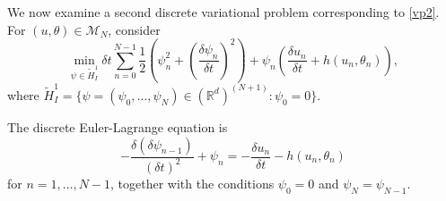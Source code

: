 \documentclass[12pt]{amsart}
\newcommand{\Rr}{{\mathbb{R}}}
\newcommand{\1}{{\chi}}
\newcommand{\lb}{\left(}
\newcommand{\rb}{\right)}
\theoremstyle{definition}
\begin{document}
         We now examine a second discrete variational problem corresponding to \eqref{vp2}. 
         For $(u,\theta)\in \mathcal{M}_N$, consider
     \begin{equation*}
                \min_{\psi\in \tilde H^1_I} \delta t \sum_{n=0}^{N-1} \frac{1}{2} \lb\psi_n^2 + \lb\frac{\delta\psi_n}{\delta t}\rb^2\rb 
            + \psi_n \lb \frac{\delta u_n}{\delta t} + h(u_n, \theta_n) \rb,   
      \end{equation*}
      where $\tilde H^1_I =\{\psi=(\psi_0, \hdots, \psi_N)\in (\Rr^d)^{(N+1)}:\psi_0=0\}$.
          
      The discrete Euler-Lagrange equation is 
      \begin{equation}\label{eq:disc_el_psi}
        -\frac{\delta(\delta\psi_{n-1})}{(\delta t)^2} + \psi_n = - \frac{\delta u_n}{\delta t} - h(u_n, \theta_n)
      \end{equation}
      for $n=1,\ldots,N-1$, together with the conditions $\psi_0=0$ and $\psi_N=\psi_{N-1}$.
          
\end{document}
